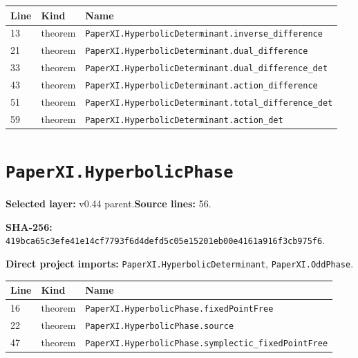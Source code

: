 \documentclass[10pt,oneside]{book}
\begin{document}
\begin{longtable}{@{}p{}p{}p{}@{}}\toprule Line&Kind&Name\\\midrule\endhead

13&theorem&\nolinkurl{PaperXI.HyperbolicDeterminant.inverse_difference}\\

21&theorem&\nolinkurl{PaperXI.HyperbolicDeterminant.dual_difference}\\

33&theorem&\nolinkurl{PaperXI.HyperbolicDeterminant.dual_difference_det}\\

43&theorem&\nolinkurl{PaperXI.HyperbolicDeterminant.action_difference}\\

51&theorem&\nolinkurl{PaperXI.HyperbolicDeterminant.total_difference_det}\\

59&theorem&\nolinkurl{PaperXI.HyperbolicDeterminant.action_det}\\

\bottomrule\end{longtable}

\section{\texorpdfstring{\nolinkurl{PaperXI.HyperbolicPhase}}{PaperXI.HyperbolicPhase}}\label{module:PaperXI.HyperbolicPhase}

\textbf{Selected layer:} v0.44 parent.\quad\textbf{Source lines:} 56.\par\textbf{SHA-256:} {\scriptsize\nolinkurl{419bca65c3efe41e14cf7793f6d4defd5c05e15201eb00e4161a916f3cb975f6}}.


\textbf{Direct project imports:} \nolinkurl{PaperXI.HyperbolicDeterminant}, \nolinkurl{PaperXI.OddPhase}.

\begin{longtable}{@{}p{}p{}p{}@{}}\toprule Line&Kind&Name\\\midrule\endhead

16&theorem&\nolinkurl{PaperXI.HyperbolicPhase.fixedPointFree}\\

22&theorem&\nolinkurl{PaperXI.HyperbolicPhase.source}\\

47&theorem&\nolinkurl{PaperXI.HyperbolicPhase.symplectic_fixedPointFree}\\

\bottomrule\end{longtable}
\end{document}
